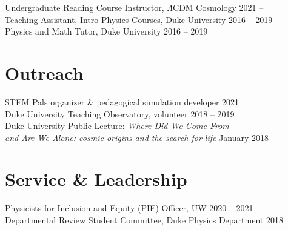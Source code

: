 \documentclass[margin]{res}
\begin{document}
\begin{resume}
Undergraduate Reading Course Instructor, $\Lambda$CDM Cosmology \hfill 2021 -- \\
Teaching Assistant, Intro Physics Courses, Duke University \hfill 2016 -- 2019 \\
Physics and Math Tutor, Duke University \hfill 2016 -- 2019 \\

\section{Outreach}

STEM Pals organizer \& pedagogical simulation developer  \hfill 2021 \\
Duke University Teaching Observatory, volunteer \hfill 2018 -- 2019 \\
Duke University Public Lecture: \textit{Where Did We Come From} \\
\hspace*{4mm} \textit{and Are We Alone: cosmic origins and the search for life} \hfill January 2018



\section{Service \& Leadership}

Physicists for Inclusion and Equity (PIE) Officer, UW \hfill 2020 -- 2021 \\
Departmental Review Student Committee, Duke Physics Department \hfill 2018 \\




\end{resume}
\end{document}
